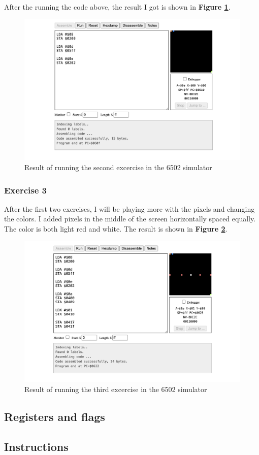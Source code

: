 \documentclass[a4paper]{article}
\begin{document}
After the running the code above, the result I got is shown in \textbf{Figure \ref{fig:05-exercise-2}}.

\begin{figure}[H]
    \centering
    \includegraphics[width=1.0\textwidth]{res/images/q2/05-exercise-2.png}
    \caption{Result of running the second excercise in the 6502 simulator}
    \label{fig:05-exercise-2}
\end{figure}

\subsubsection{Exercise 3}

After the first two exercises, I will be playing more with the pixels and changing the colors. I added pixels in the middle of the screen horizontally spaced equally. The color is both light red and white. The result is shown in  \textbf{Figure \ref{fig:06-exercise-3}}.

\begin{figure}[H]
    \centering
    \includegraphics[width=1.0\textwidth]{res/images/q2/06-exercise-3.png}
    \caption{Result of running the third excercise in the 6502 simulator}
    \label{fig:06-exercise-3}
\end{figure}

\subsection{Registers and flags}

\subsection{Instructions}
\end{document}
